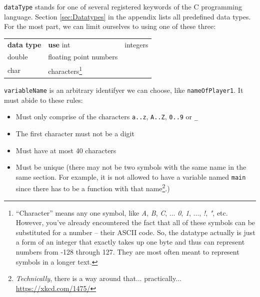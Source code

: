 \texttt{dataType} stands for one of several registered keywords of the C programming language. Section \ref{sec:Datatypes} in the appendix lists all predefined data types. For the most part, we can limit ourselves to using one of these three:
\begin{center}

\begin{tabularx}
	{.5505\linewidth}
	{TU}
\toprule[1.5pt]
	\textbf{\textrm{data type}} & \textbf{use} \tabcrlf
	int                         & integers \\
	double                      & floating point numbers \\
	char                        & characters\footnote{
		\enquote{Character} means any one symbol, like \emph{A}, \emph{B}, \emph{C}, ... \emph{0}, \emph{1}, ..., \emph{!}, \emph{"}, etc. However, you've already encountered the fact that all of these
		symbols can be substituted for a number -- their ASCII code. So, the datatype  actually is just a form of an integer that exactly takes up one byte and thus can 
		represent numbers from -128 through 127. They are most often meant to represent symbols in a longer text.
	} \\
\bottomrule[1.5pt]
\end{tabularx}
\end{center}

\texttt{variableName} is an arbitrary identifyer we can choose, like \texttt{nameOfPlayer1}. It must abide to these rules: \vspace{-9pt}
\begin{itemize}
\setlength\itemsep{0pt}
\item Must only comprise of the characters \texttt{a..z}, \texttt{A..Z}, \texttt{0..9} or \texttt{\_}
\item The first character must not be a digit
\item Must have at most 40 characters
\item Must be unique (there may not be two symbols with the same name in the same section. For example, it is not allowed to have a variable named \texttt{main} 
	since there has to be a function with that name\footnote{\emph{Technically}, there is a way around that... practically... \url{https://xkcd.com/1475/}}.)
\end{itemize}
\vspace{-8pt}

